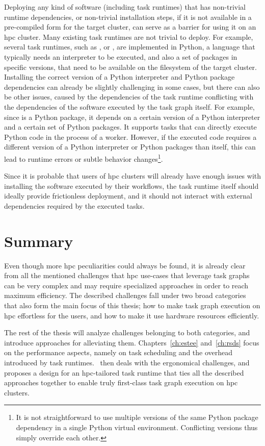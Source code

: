 Deploying any kind of software (including task runtimes) that has non-trivial runtime dependencies,
or non-trivial installation steps, if it is not available in a pre-compiled form for the target
cluster, can serve as a barrier for using it on an \gls{hpc} cluster. Many
existing task runtimes are not trivial to deploy. For example, several task runtimes, such as
\dask{}, \snakemake{} or \pycompss{}, are
implemented in Python, a language that typically needs an interpreter to be executed, and also a
set of packages in specific versions, that need to be available on the filesystem of the target
cluster. Installing the correct version of a Python interpreter and Python package dependencies can
already be slightly challenging in some cases, but there can also be other issues, caused by the
dependencies of the task runtime conflicting with the dependencies of the software executed by the
task graph itself. For example, since \dask{} is a Python package, it depends
on a certain version of a Python interpreter and a certain set of Python packages. It supports
tasks that can directly execute Python code in the process of a \dask{} worker.
However, if the executed code requires a different version of a Python interpreter or Python
packages than \dask{} itself, this can lead to runtime errors or subtle
behavior changes\footnote{It is not straightforward to use multiple versions of the same Python package dependency in a
single Python virtual environment. Conflicting versions thus simply override each other.}.

Since it is probable that users of \gls{hpc} clusters will already have enough
issues with installing the software executed by their workflows, the task runtime itself should
ideally provide frictionless deployment, and it should not interact with external dependencies
required by the executed tasks.

\section*{Summary}
Even though more \gls{hpc} peculiarities could always be found, it is already
clear from all the mentioned challenges that \gls{hpc} use-cases that leverage
task graphs can be very complex and may require specialized approaches in order to reach maximum
efficiency. The described challenges fall under two broad categories that also form the main focus
of this thesis; how to make task graph execution on \gls{hpc} effortless for the
users, and how to make it use hardware resources efficiently.

The rest of the thesis will analyze challenges belonging to both categories, and introduce
approaches for alleviating them. Chapters~\ref{ch:estee}
and~\ref{ch:rsds} focus on the performance aspects, namely on task scheduling and the
overhead introduced by task runtimes.~ then deals with the ergonomical
challenges, and proposes a design for an \gls{hpc}-tailored task runtime that
ties all the described approaches together to enable truly first-class task graph execution on
\gls{hpc} clusters.
